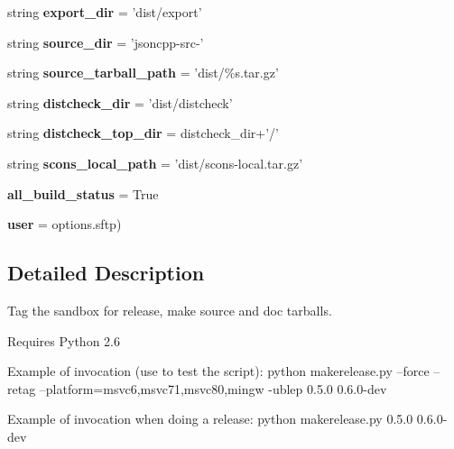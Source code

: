 \begin{DoxyCompactItemize}
\item 
\hypertarget{namespacemakerelease_a642845937ae669f5c00bb0f65a3e3d0d}{string {\bfseries export\+\_\+dir} = 'dist/export'}\label{namespacemakerelease_a642845937ae669f5c00bb0f65a3e3d0d}

\item 
\hypertarget{namespacemakerelease_af540adcea32d5edb297a4feb0583e69d}{string {\bfseries source\+\_\+dir} = 'jsoncpp-\/src-\/'}\label{namespacemakerelease_af540adcea32d5edb297a4feb0583e69d}

\item 
\hypertarget{namespacemakerelease_a82416c6434dc4a493fa1f1282848522a}{string {\bfseries source\+\_\+tarball\+\_\+path} = 'dist/\%s.\+tar.\+gz'}\label{namespacemakerelease_a82416c6434dc4a493fa1f1282848522a}

\item 
\hypertarget{namespacemakerelease_a6cf80f1ef4f444214ab86fd9b8f7fa44}{string {\bfseries distcheck\+\_\+dir} = 'dist/distcheck'}\label{namespacemakerelease_a6cf80f1ef4f444214ab86fd9b8f7fa44}

\item 
\hypertarget{namespacemakerelease_a2aa208781ae5376bd84c2985e178cd52}{string {\bfseries distcheck\+\_\+top\+\_\+dir} = distcheck\+\_\+dir+'/'}\label{namespacemakerelease_a2aa208781ae5376bd84c2985e178cd52}

\item 
\hypertarget{namespacemakerelease_aae23dbe6a4253bbfbebd743358dad44c}{string {\bfseries scons\+\_\+local\+\_\+path} = 'dist/scons-\/local.\+tar.\+gz'}\label{namespacemakerelease_aae23dbe6a4253bbfbebd743358dad44c}

\item 
\hypertarget{namespacemakerelease_a2d0240522c4119a7d8def3838a3caac5}{{\bfseries all\+\_\+build\+\_\+status} = True}\label{namespacemakerelease_a2d0240522c4119a7d8def3838a3caac5}

\item 
\hypertarget{namespacemakerelease_a54ed57db884bb8f3cd650ba5f36629f8}{{\bfseries user} = options.\+sftp)}\label{namespacemakerelease_a54ed57db884bb8f3cd650ba5f36629f8}

\end{DoxyCompactItemize}


\subsection{Detailed Description}
\begin{DoxyVerb}Tag the sandbox for release, make source and doc tarballs.

Requires Python 2.6

Example of invocation (use to test the script):
python makerelease.py --force --retag --platform=msvc6,msvc71,msvc80,mingw -ublep 0.5.0 0.6.0-dev

Example of invocation when doing a release:
python makerelease.py 0.5.0 0.6.0-dev
\end{DoxyVerb}
 

